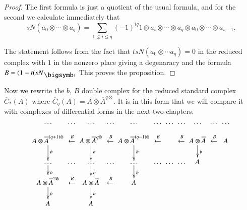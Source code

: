 \begin{proof}
The first formula is just a quotient of the usual formula, and for the
second we calculate immediately that
$$
sN(a_{0}\otimes\cdots\otimes a_{q})=\sum_{1\leq i\leq
  q}(-1)^{iq}1\otimes a_{i}\otimes\cdots\otimes a_{q}\otimes
a_{0}\otimes \cdots\otimes a_{i-1}. 
$$

The statement follows from the fact that $tsN(a_{0}\otimes\cdots
a_{q})=0$ in the reduced complex with $1$ in the nonzero place giving
a degenaracy and the formula $B=(1-t(sN_{\bigdot}$ This proves the
proposition. 
\end{proof}

Now we rewrite the $b$, $B$ double complex for the reduced standard
complex $\overline{C}_{\ast}(A)$ where $\overline{C}_{q}(A)=A\otimes
\overline{A}^{q\otimes}$. It is in this form that we will compare it
with complexes of differential forms in the next two chapters.
\[
\xymatrix@C=0cm@R=.5cm{
\ldots & \ldots & \ldots & \ldots & \ldots & \ldots & \ldots & \ldots
& \ldots & \ldots & \ldots\\
A\otimes \overline{A}^{(q+1)\otimes}\ar[d]^{b} & \xleftarrow{B} &
A\otimes \overline{A}^{q\otimes}\ar[d]^{b} & \xleftarrow{B} & A\otimes
\overline{A}^{(q-1)\otimes}\ar[d]^{b} 
& \xleftarrow{B} & & \xleftarrow{B} & A\otimes \overline{A}\ar[d]^{b}
& \xleftarrow{B} & A\\
\ldots\ar[d]^{b} & \ldots & \ldots\ar[d]^{b} & \ldots & \ldots
\ar[d]^{b} & \ldots & \ldots & \ldots & A\\
A\otimes \overline{A}^{2\otimes}\ar[d]^{b} & \xleftarrow{B} & A\otimes
\overline{A}\ar[d]^{b} & \xleftarrow{B} & A \\
A & & A 
}
\]




